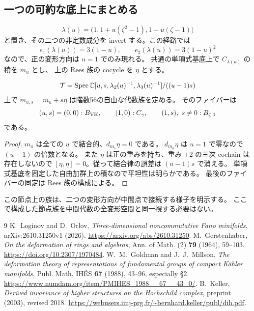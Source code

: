 \subsection{一つの可約な底上にまとめる}
\[
 \lambda(u)=\bigl(1,1+u(\zeta^2-1),1+u(\zeta-1)\bigr)
\]
と置き、その二つの非定数成分を invert する。この経路では
\[
 e_1(\lambda(u))=3(1-u),\qquad e_2(\lambda(u))=3(1-u)^2
\]
なので、正の変形方向は $u=1$ でのみ現れる。
共通の単項式基底上で $C_{\lambda(u)}$ の積を $m_u$ とし、
上の Rees 族の cocycle を $\eta$ とする。
\begin{proposition}\label{prop:node}
\[
 \mathcal T=\operatorname{Spec}\mathbb C[u,s,\lambda_2(u)^{-1},\lambda_3(u)^{-1}]/((u-1)s)
\]
上で $m_{u,s}=m_u+s\eta$ は階数56の自由な代数族を定める。
そのファイバーは
\[
 (u,s)=(0,0):B_{\mathrm{VK}},\qquad (1,0):C_\gamma,\qquad
 (1,s),\ s\ne0:B_{\zeta,1}
\]
である。
\end{proposition}
\begin{proof}
$m_u$ は全ての $u$ で結合的、$d_{m_1}\eta=0$ である。
$d_{m_u}\eta$ は $u=1$ で零なので $(u-1)$ の倍数となる。
また $\eta$ は正の重みを持ち、重み $+2$ の三次 cochain は存在しないので
$[\eta,\eta]=0$。従って結合律の誤差は $(u-1)s$ で消える。
単項式基底を固定した自由加群上の積なので平坦性は明らかである。
最後のファイバーの同定は Rees 族の構成による。
\end{proof}

この節点上の族は、二つの変形方向が中間点で接続する様子を明示する。
ここで構成した節点族を中間代数の全変形空間と同一視する必要はない。


\begin{thebibliography}{9}
 K.~Loginov and D.~Orlov,
\emph{Three-dimensional noncommutative Fano minifolds}, arXiv:2610.31250v1 (2026).
\url{https://arxiv.org/abs/2610.31250}.
 M.~Gerstenhaber,
\emph{On the deformation of rings and algebras}, Ann. of Math. (2) \textbf{79} (1964), 59--103.
\url{https://doi.org/10.2307/1970484}.
 W.~M.~Goldman and J.~J.~Millson,
\emph{The deformation theory of representations of fundamental groups of compact K\"ahler manifolds},
Publ. Math. IH\'ES \textbf{67} (1988), 43--96, especially \S2.
\url{https://www.numdam.org/item/PMIHES_1988__67__43_0/}.
 B.~Keller,
\emph{Derived invariance of higher structures on the Hochschild complex}, preprint (2003), revised 2018.
\url{https://webusers.imj-prg.fr/~bernhard.keller/publ/dih.pdf}.
\end{thebibliography}

